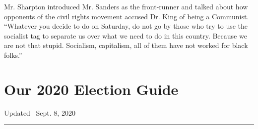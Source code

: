 Mr. Sharpton introduced Mr. Sanders as the front-runner and talked about
how opponents of the civil rights movement accused Dr. King of being a
Communist. ``Whatever you decide to do on Saturday, do not go by those
who try to use the socialist tag to separate us over what we need to do
in this country. Because we are not that stupid. Socialism, capitalism,
all of them have not worked for black folks.''

\hypertarget{our-2020-election-guide}{%
\section{Our 2020 Election Guide}\label{our-2020-election-guide}}

Updated ~Sept. 8, 2020

\begin{center}\rule{0.5\linewidth}{\linethickness}\end{center}

